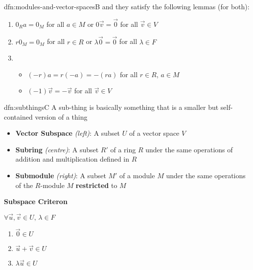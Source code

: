 \documentclass[landscape, 8pt]{extarticle}
\begin{document}
\begin{multicols}{3}
\begin{dfn}{dfn:modules-and-vector-spaces}{B}
    \vspace{-8pt}
    and they satisfy the following lemmas (for both):
    \vspace{-3pt}
    \begin{enumerate}
        \setlength\itemsep{0em}
        \item $0_{R} a = 0_{M}$ for all $a\in M$ \quad or \quad $0 \vec{v} = \vec{0}$ for all $\vec{v} \in V$
        \item $r 0_{M} = 0_{M}$ for all $r\in R$ \quad or \quad $\lambda \vec{0} = \vec{0}$ for all $\lambda\in F$
        \item \begin{itemize}[leftmargin=*]
            \setlength\itemsep{0em}
            \item $(-r)a = r(-a) = -(ra)$ for all $r\in R$, $a\in M$
            \item $(-1)\vec{v} = -\vec{v}$ for all $\vec{v}\in V$
        \end{itemize}
    \end{enumerate}
\end{dfn}

\vspace{-5pt}
\begin{dfn}{dfn:subthings}{C}
    \vspace{-5pt}
    A sub-thing is basically something that is a smaller but self-contained version of a thing

    \vspace{-5pt}
    \begin{itemize}
        \setlength\itemsep{0em}
        \item \textbf{Vector Subspace} \textit{(left)}: A subset $U$ of a vector space $V$
        \item \textbf{Subring} \textit{(centre)}: A subset $R'$ of a ring $R$ under the same operations of addition and multiplication defined in $R$
        \item \textbf{Submodule} \textit{(right)}: A subset $M'$ of a module $M$ under the same operations of the $R$-module $M$ \textbf{restricted} to $M$
    \end{itemize}

    \vspace{-20pt}
    \setlength{\columnseprule}{0.5pt}
    \begin{multicols}{3}
        \textbf{Subspace Criteron}

        $\forall\vec{u}, \vec{v}\in U,\,\lambda\in F$
        \begin{enumerate}[leftmargin=*]
            \item $\vec{0}\in U$
            \item $\vec{u} + \vec{v} \in U$
            \item $\lambda \vec{u}\in U$
        \end{enumerate}
        \columnbreak    


\end{multicols}
\end{dfn}
\end{multicols}
\end{document}
